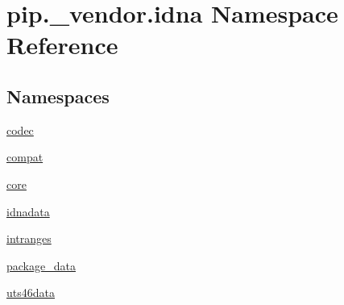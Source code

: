 \hypertarget{namespacepip_1_1__vendor_1_1idna}{}\section{pip.\+\_\+vendor.\+idna Namespace Reference}
\label{namespacepip_1_1__vendor_1_1idna}
\subsection*{Namespaces}
\begin{DoxyCompactItemize}
\item 
 \hyperlink{namespacepip_1_1__vendor_1_1idna_1_1codec}{codec}
\item 
 \hyperlink{namespacepip_1_1__vendor_1_1idna_1_1compat}{compat}
\item 
 \hyperlink{namespacepip_1_1__vendor_1_1idna_1_1core}{core}
\item 
 \hyperlink{namespacepip_1_1__vendor_1_1idna_1_1idnadata}{idnadata}
\item 
 \hyperlink{namespacepip_1_1__vendor_1_1idna_1_1intranges}{intranges}
\item 
 \hyperlink{namespacepip_1_1__vendor_1_1idna_1_1package__data}{package\+\_\+data}
\item 
 \hyperlink{namespacepip_1_1__vendor_1_1idna_1_1uts46data}{uts46data}
\end{DoxyCompactItemize}

